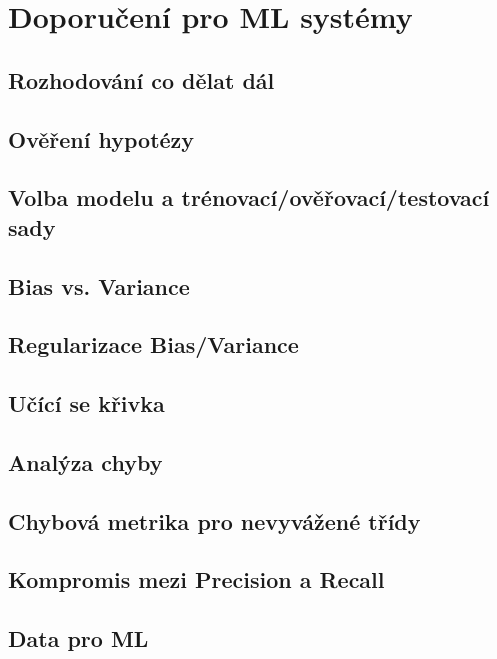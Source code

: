 
\chapter{Doporučení pro ML systémy}

\section{Rozhodování co dělat dál}
\section{Ověření hypotézy}
\section{Volba modelu a trénovací/ověřovací/testovací sady}
\section{Bias vs. Variance}
\section{Regularizace Bias/Variance}
\section{Učící se křivka}


\section{Analýza chyby}
\section{Chybová metrika pro nevyvážené třídy}
\section{Kompromis mezi Precision a Recall}
\section{Data pro ML}
